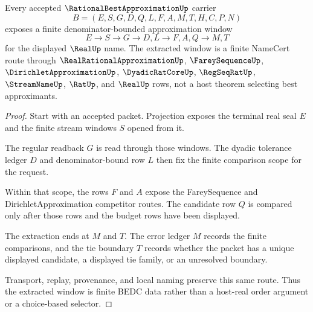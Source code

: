 \begin{theorem}
\label{thm:rational-best-approximation-window-extraction}
Every accepted $\RationalBestApproximationUp$ carrier
$$
B=(E,S,G,D,Q,L,F,A,M,T,H,C,P,N)
$$
exposes a finite denominator-bounded approximation window
$$
E \longrightarrow S \longrightarrow G \longrightarrow D,L \longrightarrow F,A,Q \longrightarrow M,T
$$
for the displayed $\RealUp$ name. The extracted window is a finite NameCert route through $\RealRationalApproximationUp$, $\FareySequenceUp$, $\DirichletApproximationUp$, $\DyadicRatCoreUp$, $\RegSeqRatUp$, $\StreamNameUp$, $\RatUp$, and $\RealUp$ rows, not a host theorem selecting best approximants.
\end{theorem}
\begin{proof}
Start with an accepted packet. Projection exposes the terminal real seal $E$ and the finite stream windows $S$ opened from it.

The regular readback $G$ is read through those windows. The dyadic tolerance ledger $D$ and denominator-bound row $L$ then fix the finite comparison scope for the request.

Within that scope, the rows $F$ and $A$ expose the FareySequence and DirichletApproximation competitor routes. The candidate row $Q$ is compared only after those rows and the budget rows have been displayed.

The extraction ends at $M$ and $T$. The error ledger $M$ records the finite comparisons, and the tie boundary $T$ records whether the packet has a unique displayed candidate, a displayed tie family, or an unresolved boundary.

Transport, replay, provenance, and local naming preserve this same route. Thus the extracted window is finite BEDC data rather than a host-real order argument or a choice-based selector.
\end{proof}

